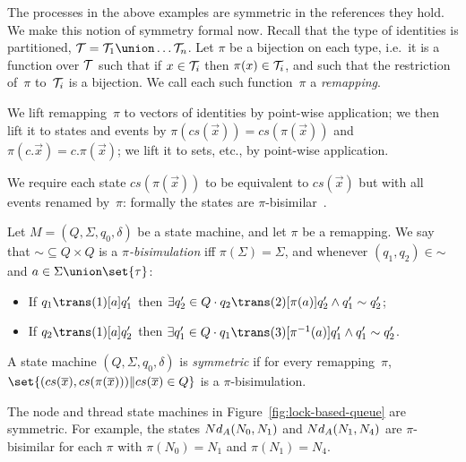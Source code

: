 The processes in the above examples are symmetric in the references they hold.
We make this notion of symmetry formal now.
%
Recall that the type of identities is partitioned, $\T
= \T_1 \union \ldots \T_n$.  Let $\pi$ be a bijection on each type, i.e.~it is
a function over $\mathcal{T}$ such that if $x \in \mathcal{T}_i$ then $\pi(x) \in \mathcal{T}_i$, and
such that the restriction of~$\pi$ to~$\mathcal{T}_i$ is a bijection.  We call each
such function~$\pi$ a \emph{remapping}.

We lift remapping~$\pi$ to vectors of identities by point-wise application; we
then lift it to states and events by $\pi(cs(\vec{x})) = cs(\pi(\vec{x}))$ and
$\pi(c.\vec{x}) = c.\pi(\vec{x})$; we lift it to sets, etc., by point-wise
application.

We require each state $cs(\pi(\vec{x}))$ to be equivalent to $cs(\vec{x})$ but
with all events renamed by~$\pi$: formally the states are
$\pi$-bisimilar~\cite{moffat-symmetry}.
%
\begin{definition}
\label{def:pi-bisimilar}
Let $M = (Q, \Sigma, q_0, \delta)$ be a state machine, and let $\pi$ be a
remapping.  We say that $\mathord{\sim} \subseteq Q \times Q$ is
a \emph{$\pi$-bisimulation} iff $\pi(\Sigma) = \Sigma$, and whenever $(q_1,
q_2) \in \mathord{\sim}$ and $a \in \Sigma \union \set{\tau}$:
%
\begin{itemize}
\item If $q_1\trans(1)[a] q_1'$ then
$\exists q_2' \in Q \cdot q_2 \trans(2)[\pi(a)] q_2' \land q_1' \sim q_2'$;

\item If $q_2 \trans(1)[a] q_2'$ then
$\exists q_1' \in Q \cdot q_1 \trans(3)[\pi^{-1}(a)] q_1' \land q_1' \sim q_2'$.
\end{itemize}
\end{definition}

\begin{definition}
\label{def:symmetric-state-machine}
A state machine $(Q, \Sigma, q_0, \delta)$ is \emph{symmetric} if for
every remapping~$\pi$,\, 
$\set{ (cs(\vec{x}), cs(\pi(\vec{x}))) \| cs(\vec{x}) \in Q}$ is a
$\pi$-bisimulation.
\end{definition}

The node and thread state machines in Figure~\ref{fig:lock-based-queue} are
symmetric.  For example, the states $Nd_A(N_0, N_1)$ and $Nd_A(N_1,N_4)$
are $\pi$-bisimilar for each $\pi$ with $\pi(N_0) = N_1$ and $\pi(N_1) = N_4$.

